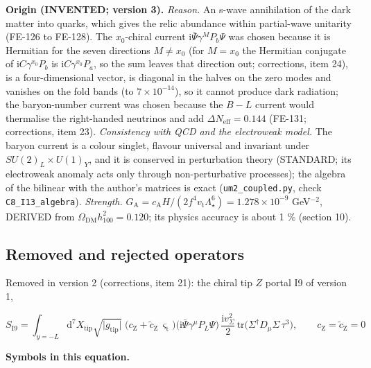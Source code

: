 \documentclass[
  10pt,
]{article}
\begin{document}
\textbf{Origin (INVENTED; version 3).} \emph{Reason.} An s-wave
annihilation of the dark matter into quarks, which gives the relic
abundance within partial-wave unitarity (FE-126 to FE-128). The
\(x_0\)-chiral current \(\mathrm{i}\bar\Psi\gamma^MP_b\Psi\) was chosen
because it is Hermitian for the seven directions \(M \ne x_0\) (for
\(M = x_0\) the Hermitian conjugate of \(\mathrm{i}C\gamma^{x_0}P_b\) is
\(\mathrm{i}C\gamma^{x_0}P_a\), so the sum leaves that direction out;
corrections, item 24), is a four-dimensional vector, is diagonal in the
halves on the zero modes and vanishes on the fold bands (to
\(7\times10^{-14}\)), so it cannot produce dark radiation; the
baryon-number current was chosen because the \(B - L\) current would
thermalise the right-handed neutrinos and add
\(\Delta N_{\mathrm{eff}} = 0.144\) (FE-131; corrections, item 23).
\emph{Consistency with QCD and the electroweak model.} The baryon
current is a colour singlet, flavour universal and invariant under
\(SU(2)_L\times U(1)_Y\), and it is conserved in perturbation theory
(STANDARD; its electroweak anomaly acts only through non-perturbative
processes); the algebra of the bilinear with the author's matrices is
exact (\texttt{um2\_coupled.py}, check \texttt{C8\_I13\_algebra}).
\emph{Strength.}
\(G_{\mathrm{A}} = c_{\mathrm{A}}H/(2f^4v_{\mathrm{t}}\Lambda_\star^6) = 1.278\times10^{-9}\)
GeV\(^{-2}\), DERIVED from \(\Omega_{\mathrm{DM}}h_{100}^2 = 0.120\);
its physics accuracy is about 1 \% (section 10).

\hypertarget{removed-and-rejected-operators}{%
\subsection{Removed and rejected
operators}\label{removed-and-rejected-operators}}

Removed in version 2 (corrections, item 21): the chiral tip \(Z\) portal
I9 of version 1,

\[
S_{\mathrm{I9}} = \int_{y=-L}\mathrm{d}^7X_{\mathrm{tip}}\sqrt{\lvert g_{\mathrm{tip}}\rvert}\;
 \big(c_{\mathrm{Z}} + \tilde c_{\mathrm{Z}}\,\varsigma_{\mathrm{t}}\big)\big(\mathrm{i}\bar\Psi\gamma^\mu P_L\Psi\big)\,
 \frac{\mathrm{i}v_\Sigma^2}{2}\,\mathrm{tr}\big(\Sigma^\dagger D_\mu\Sigma\,\tau^3\big),\qquad
c_{\mathrm{Z}} = \tilde c_{\mathrm{Z}} = 0
\]

\textbf{Symbols in this equation.}
\end{document}
